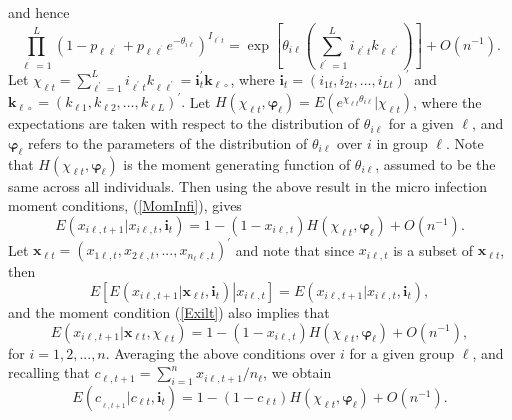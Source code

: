 \documentclass[12pt]{article}
\begin{document}
and hence%
\begin{equation}
\prod_{\ell^{^{\prime}}=1}^{L}\left(  1-p_{\ell\ell^{^{\prime}}}+p_{\ell
\ell^{^{\prime}}}e^{-\theta_{i\ell}}\right)  ^{I_{\ell^{\prime}t}}=\exp\left[
\theta_{i\ell}\left(  \sum_{\ell^{\prime}=1}^{L}i_{\ell^{\prime}t}k_{\ell
\ell^{\prime}}\right)  \right]  +O\left(  n^{-1}\right)  .\label{product_pll'}%
\end{equation}
Let $\chi_{\ell t}=\sum_{\ell^{\prime}=1}^{L}i_{\ell^{\prime}t}k_{\ell
\ell^{\prime}}=\mathbf{i}_{t}^{\prime}\mathbf{k}_{\ell\circ}$, where
$\mathbf{i}_{t}=(i_{1t},i_{2t},\ldots,i_{Lt})^{\prime}$ and $\mathbf{k}%
_{\ell\circ}=\left(  k_{\ell1},k_{\ell2},\ldots,k_{\ell L}\right)  ^{\prime}.$
Let $H\left(  \chi_{\ell t},\boldsymbol{\varphi}_{\ell}\right)  =E\left(
e^{\chi_{\ell t}\theta_{i\ell}}|\chi_{\ell t}\right)  $, where the
expectations are taken with respect to the distribution of $\theta_{i\ell}$
for a given $\ell$, and $\boldsymbol{\varphi}_{\ell}$ refers to the parameters
of the distribution of $\theta_{i\ell}$ over $i$ in group $\ell$. Note that
$H\left(  \chi_{\ell t},\boldsymbol{\varphi}_{\ell}\right)  $ is the moment
generating function of $\theta_{i\ell}$, assumed to be the same across all
individuals. Then using the above result in the micro infection moment
conditions, (\ref{MomInfi}), gives%
\begin{equation}
E\left(  x_{i\ell,t+1}|x_{i\ell,t},\mathbf{i}_{t}\right)  =1-\left(
1-x_{i\ell,t}\right)  H\left(  \chi_{\ell t},\boldsymbol{\varphi}_{\ell
}\right)  +O\left(  n^{-1}\right)  .\label{Exilt}%
\end{equation}
Let $\mathbf{x}_{\ell t}=(x_{1\ell,t},x_{2\ell,t},...,x_{n_{\ell}\ell
,t})^{\prime}$ and note that since $x_{i\ell,t}$ is a subset of $\mathbf{x}%
_{\ell t}$, then
\[
E\left[  E\left(  x_{i\ell,t+1}|\mathbf{x}_{\ell t},\mathbf{i}_{t}\right)
\left\vert x_{i\ell,t}\right.  \right]  =E\left(  x_{i\ell,t+1}|x_{i\ell
,t},\mathbf{i}_{t}\right)  ,
\]
and the moment condition (\ref{Exilt}) also implies that
\begin{equation}
E\left(  x_{i\ell,t+1}|\mathbf{x}_{\ell t},\chi_{\ell t}\right)  =1-\left(
1-x_{i\ell,t}\right)  H\left(  \chi_{\ell t},\boldsymbol{\varphi}_{\ell
}\right)  +O\left(  n^{-1}\right)  ,\label{ExiltB}%
\end{equation}
for $i=1,2,...,n$. Averaging the above conditions over $i$ for a given group
$\ell$, and recalling that $c_{\ell,t+1}=\sum_{i=1}^{n}x_{i\ell,t+1}/n_{\ell}%
$, we obtain\
\begin{equation}
E\left(  c_{_{\ell,t+1}}|c_{\ell t},\mathbf{i}_{t}\right)  =1-\left(
1-c_{\ell t}\right)  H\left(  \chi_{\ell t},\boldsymbol{\varphi}_{\ell
}\right)  +O\left(  n^{-1}\right)  .\label{clmoments_general}%
\end{equation}
\end{document}
